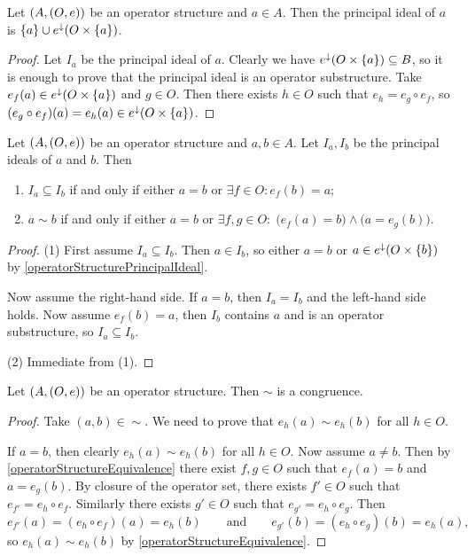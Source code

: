 \begin{lemma} \label{operatorStructurePrincipalIdeal}
Let $\left( A, (O, e) \right)$ be an operator structure and $a\in A$. Then the principal ideal of $a$ is $\{a\}\cup e^\downarrow(O\times\{a\})$.
\end{lemma}
\begin{proof}
Let $I_a$ be the principal ideal of $a$.
Clearly we have $e^\downarrow(O\times\{a\}) \subseteq B$, so it is enough to prove that the principal ideal is an operator substructure. Take $e_f(a) \in e^\downarrow(O\times\{a\})$ and $g\in O$. Then there exists $h\in O$ such that $e_h = e_g\circ e_f$, so $(e_g\circ e_f)(a) = e_h(a) \in e^\downarrow(O\times\{a\})$.
\end{proof}

\begin{lemma} \label{operatorStructureEquivalence}
Let $\left( A, (O, e) \right)$ be an operator structure and $a,b\in A$. Let $I_a, I_b$ be the principal ideals of $a$ and $b$. Then
\begin{enumerate}
\item $I_a \subseteq I_b$ \textup{if and only if} either $a=b$ or $\exists f\in O: e_f(b) = a$;
\item $a\sim b$ \textup{if and only if} either $a=b$ or $\exists f,g\in O: \; \big(e_f(a) = b\big) \land \big(a = e_g(b)\big)$.
\end{enumerate}
\end{lemma}
\begin{proof}
(1) First assume $I_a \subseteq I_b$. Then $a\in I_b$, so either $a=b$ or $a\in e^\downarrow(O\times\{b\})$ by \ref{operatorStructurePrincipalIdeal}.

Now assume the right-hand side. If $a=b$, then $I_a =I_b$ and the left-hand side holds. Now assume $e_f(b) = a$, then $I_b$ contains $a$ and is an operator substructure, so $I_a \subseteq I_b$.

(2) Immediate from (1).
\end{proof}


\begin{proposition} \label{operatorStructureEquivalenceCongruence}
Let $\left( A, (O, e) \right)$ be an operator structure. Then $\sim$ is a congruence.
\end{proposition}
\begin{proof}
Take $(a, b) \in {\sim}$. We need to prove that $e_h(a) \sim e_h(b)$ for all $h\in O$.

If $a=b$, then clearly $e_h(a) \sim e_h(b)$ for all $h\in O$. Now assume $a\neq b$. Then by \ref{operatorStructureEquivalence} there exist $f,g\in O$ such that $e_f(a) = b$ and $a = e_g(b)$. By closure of the operator set, there exists $f'\in O$ such that $e_{f'} = e_h \circ e_f$. Similarly there exists $g'\in O$ such that $e_{g'} = e_h\circ e_g$. Then
\[ e_{f'}(a) = (e_h \circ e_f)(a) = e_h(b) \qquad\text{and}\qquad e_{g'}(b) = (e_h \circ e_g)(b) = e_h(a), \]
so $e_h(a) \sim e_h(b)$ by \ref{operatorStructureEquivalence}.
\end{proof}


